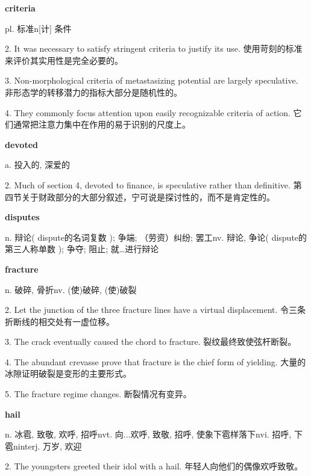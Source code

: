\documentclass[12pt]{book}
\begin{document}
\vspace{12pt}

\textbf{criteria}

pl. 标准n[计] 条件

2.  It was necessary to satisfy stringent criteria to justify its use.  使用苛刻的标准来评价其实用性是完全必要的。 


3.  Non-morphological criteria of metastasizing potential are largely speculative.  非形态学的转移潜力的指标大部分是随机性的。 


4.  They commonly focus attention upon easily recognizable criteria of action.  它们通常把注意力集中在作用的易于识别的尺度上。 


\vspace{12pt}

\textbf{devoted}

a. 投入的, 深爱的

2.  Much of section 4, devoted to finance, is speculative rather than definitive.  第四节关于财政部分的大部分叙述，宁可说是探讨性的，而不是肯定性的。 


\vspace{12pt}

\textbf{disputes}

n. 辩论( dispute的名词复数 ); 争端; （劳资）纠纷; 罢工nv. 辩论, 争论( dispute的第三人称单数 ); 争夺; 阻止; 就…进行辩论

\vspace{12pt}

\textbf{fracture}

n. 破碎, 骨折nv. (使)破碎, (使)破裂

2.  Let the junction of the three fracture lines have a virtual displacement.  令三条折断线的相交处有一虚位移。 


3.  The crack eventually caused the chord to fracture.  裂纹最终致使弦杆断裂。 


4.  The abundant crevasse prove that fracture is the chief form of yielding.  大量的冰隙证明破裂是变形的主要形式。 


5.  The fracture regime changes.  断裂情况有变异。 


\vspace{12pt}

\textbf{hail}

n. 冰雹, 致敬, 欢呼, 招呼nvt. 向...欢呼, 致敬, 招呼, 使象下雹样落下nvi. 招呼, 下雹ninterj. 万岁, 欢迎

2.  The youngsters greeted their idol with a hail.  年轻人向他们的偶像欢呼致敬。 
\end{document}
